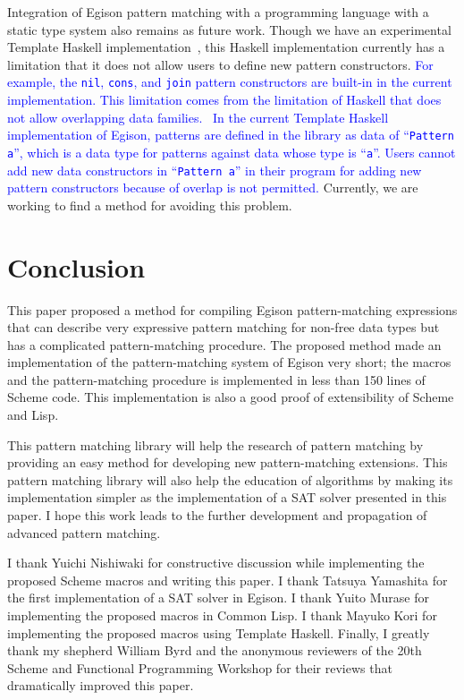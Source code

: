 \documentclass[acmlarge]{acmart}
\newcommand{\new}[1]{\textcolor{blue}{#1}}
\begin{document}
Integration of Egison pattern matching with a programming language with a static type system also remains as future work.
Though we have an experimental Template Haskell implementation~\cite{egisonHaskell}, this Haskell implementation currently has a limitation that it does not allow users to define new pattern constructors.
\new{
For example, the \lstinline{nil}, \lstinline{cons}, and \lstinline{join} pattern constructors are built-in in the current implementation.
This limitation comes from the limitation of Haskell that does not allow overlapping data families.~\cite{ghcMan}
In the current Template Haskell implementation of Egison, patterns are defined in the library as data of ``\lstinline{Pattern a}'', which is a data type for patterns against data whose type is ``\lstinline{a}''.
Users cannot add new data constructors in ``\lstinline{Pattern a}'' in their program for adding new pattern constructors because of overlap is not permitted.
}%
Currently, we are working to find a method for avoiding this problem.


\section{Conclusion}\label{conclusion}

This paper proposed a method for compiling Egison pattern-matching expressions that can describe very expressive pattern matching for non-free data types but has a complicated pattern-matching procedure.
The proposed method made an implementation of the pattern-matching system of Egison very short; the macros and the pattern-matching procedure is implemented in less than 150 lines of Scheme code.
This implementation is also a good proof of extensibility of Scheme and Lisp.

This pattern matching library will help the research of pattern matching by providing an easy method for developing new pattern-matching extensions.
This pattern matching library will also help the education of algorithms by making its implementation simpler as the implementation of a SAT solver presented in this paper.
I hope this work leads to the further development and propagation of advanced pattern matching.

\begin{acks}
  I thank Yuichi Nishiwaki for constructive discussion while implementing the proposed Scheme macros and writing this paper.
  I thank Tatsuya Yamashita for the first implementation of a SAT solver in Egison.
  I thank Yuito Murase for implementing the proposed macros in Common Lisp.
  I thank Mayuko Kori for implementing the proposed macros using Template Haskell.
  Finally, I greatly thank my shepherd William Byrd and the anonymous reviewers of the 20th Scheme and Functional Programming Workshop for their reviews that dramatically improved this paper.
\end{acks}
\end{document}
